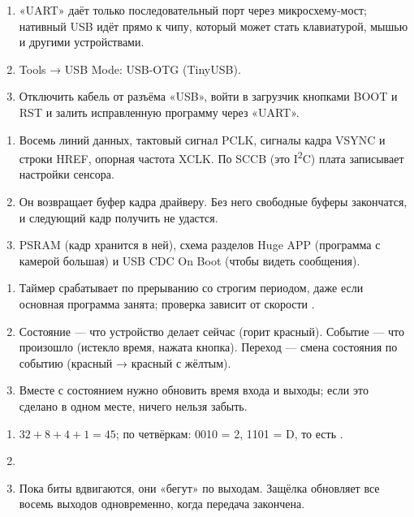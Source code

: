 \begin{enumerate}
  \item «UART» даёт только последовательный порт через микросхему-мост; нативный USB идёт прямо к чипу, который может стать клавиатурой, мышью и другими устройствами.
  \item \textsf{Tools → USB Mode: USB-OTG (TinyUSB)}.
  \item Отключить кабель от разъёма «USB», войти в загрузчик кнопками BOOT и RST и залить исправленную программу через «UART».
\end{enumerate}

\begin{enumerate}
  \item Восемь линий данных, тактовый сигнал PCLK, сигналы кадра VSYNC и строки HREF, опорная частота XCLK. По SCCB (это I\textsuperscript{2}C) плата записывает настройки сенсора.
  \item Он возвращает буфер кадра драйверу. Без него свободные буферы закончатся, и следующий кадр получить не удастся.
  \item PSRAM (кадр хранится в ней), схема разделов Huge APP (программа с камерой большая) и USB CDC On Boot (чтобы видеть сообщения).
\end{enumerate}

\begin{enumerate}
  \item Таймер срабатывает по прерыванию со строгим периодом, даже если основная программа занята; проверка  зависит от скорости .
  \item Состояние --- что устройство делает сейчас (горит красный). Событие --- что произошло (истекло время, нажата кнопка). Переход --- смена состояния по событию (красный → красный с жёлтым).
  \item Вместе с состоянием нужно обновить время входа и выходы; если это сделано в одном месте, ничего нельзя забыть.
\end{enumerate}

\begin{enumerate}
  \item $32 + 8 + 4 + 1 = 45$; по четвёркам: 0010 = 2, 1101 = D, то есть .
  \item {}
  \item Пока биты вдвигаются, они «бегут» по выходам. Защёлка обновляет все восемь выходов одновременно, когда передача закончена.
\end{enumerate}

